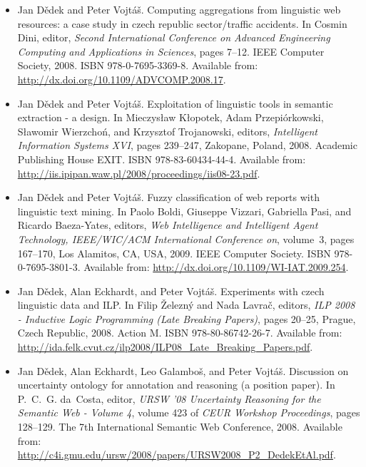 \documentclass[12pt,a4paper,twoside,notitlepage]{article}
\begin{document}
\begin{itemize}
\item
Jan D{\v{e}}dek and Peter Vojt{\'{a}}{\v{s}}.
\newblock Computing aggregations from linguistic web resources: a case study in
  czech republic sector/traffic accidents.
\newblock In Cosmin Dini, editor, {\em Second International Conference on
  Advanced Engineering Computing and Applications in Sciences}, pages 7--12.
  {IEEE} Computer Society, 2008.
\newblock ISBN 978-0-7695-3369-8.
\newblock Available from: \url{http://dx.doi.org/10.1109/ADVCOMP.2008.17}.

\item
Jan D{\v{e}}dek and Peter Vojt{\'{a}}{\v{s}}.
\newblock Exploitation of linguistic tools in semantic extraction - a design.
\newblock In Mieczys{{\l}}aw K{{\l}}opotek, Adam Przepi{\'{o}}rkowski,
  S{{\l}}awomir Wierzcho{\'{n}}, and Krzysztof Trojanowski, editors, {\em
  Intelligent Information Systems {XVI}}, pages 239--247, Zakopane, Poland,
  2008. Academic Publishing House {EXIT}.
\newblock ISBN 978-83-60434-44-4.
\newblock Available from:
  \url{http://iis.ipipan.waw.pl/2008/proceedings/iis08-23.pdf}.


\item
Jan D{\v{e}}dek and Peter Vojt{\'{a}}{\v{s}}.
\newblock Fuzzy classification of web reports with linguistic text mining.
\newblock In Paolo Boldi, Giuseppe Vizzari, Gabriella Pasi, and Ricardo
  Baeza-Yates, editors, {\em Web Intelligence and Intelligent Agent Technology,
  IEEE/WIC/ACM International Conference on}, volume~3, pages 167--170, Los
  Alamitos, CA, USA, 2009. IEEE Computer Society.
\newblock ISBN 978-0-7695-3801-3.
\newblock Available from: \url{http://dx.doi.org/10.1109/WI-IAT.2009.254}.


\item
Jan D{\v{e}}dek, Alan Eckhardt, and Peter Vojt{\'{a}}{\v{s}}.
\newblock Experiments with czech linguistic data and {ILP}.
\newblock In Filip {\v{Z}}elezn{\'{y}} and Nada Lavra{\v{c}}, editors, {\em
  {ILP} 2008 - Inductive Logic Programming (Late Breaking Papers)}, pages
  20--25, Prague, Czech Republic, 2008. Action M.
\newblock ISBN 978-80-86742-26-7.
\newblock Available from:
  \url{http://ida.felk.cvut.cz/ilp2008/ILP08_Late_Breaking_Papers.pdf}.




\item
Jan D{\v{e}}dek, Alan Eckhardt, Leo Galambo{\v{s}}, and Peter
  Vojt{\'{a}}{\v{s}}.
\newblock Discussion on uncertainty ontology for annotation and reasoning (a
  position paper).
\newblock In P.~C.~G. da~Costa, editor, {\em {URSW} '08 Uncertainty Reasoning
  for the Semantic Web - Volume 4}, volume 423 of {\em {CEUR} Workshop
  Proceedings}, pages 128--129. The 7th International Semantic Web Conference,
  2008.
\newblock Available from:
  \url{http://c4i.gmu.edu/ursw/2008/papers/URSW2008_P2_DedekEtAl.pdf}.



\end{itemize}
\end{document}
